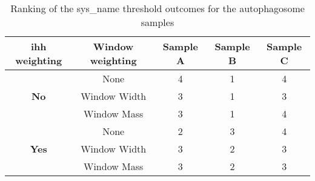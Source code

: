 \begin{table}[h!]
    \centering
    \begin{tabular}{ccccc}
    \hline
    \textbf{\gls{ihh} weighting} & \textbf{Window weighting} & \textbf{Sample A} & \textbf{Sample B} & \textbf{Sample C} \\ \hline
    \multirow{3}{*}{\textbf{No}} & None & 4 & 1 & 4 \\
    & Window Width & 3 & 1 & 3 \\ & Window Mass & 3 & 1 & 4\\ \hline
    \multirow{3}{*}{\textbf{Yes}} & None & 2 & 3 & 4 \\
    & Window Width & 3 & 2 & 3 \\ & Window Mass & 3 & 2 & 3 \\ \hline
    \end{tabular}
    \caption[Ranking of the AHT threshold outcomes for the autophagosome samples]{Ranking of the \gls{sys_name} threshold outcomes for the autophagosome samples}
    \label{tab:ihh_auto_rankings}
\end{table}
